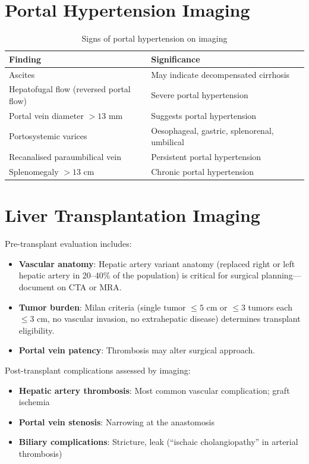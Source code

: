 \section{Portal Hypertension Imaging}
\begin{table}[h]
\centering
\caption{Signs of portal hypertension on imaging}
\begin{tabular}{p{5cm} p{5cm}}
\hline
\textbf{Finding} & \textbf{Significance} \\
\hline
Ascites & May indicate decompensated cirrhosis \\
Hepatofugal flow (reversed portal flow) & Severe portal hypertension \\
Portal vein diameter $> 13$ mm & Suggests portal hypertension \\
Portosystemic varices & Oesophageal, gastric, splenorenal, umbilical \\
Recanalised paraumbilical vein & Persistent portal hypertension \\
Splenomegaly $> 13$ cm & Chronic portal hypertension \\
\hline
\end{tabular}
\end{table}


\section{Liver Transplantation Imaging}
Pre-transplant evaluation includes:
\begin{itemize}
  \item \textbf{Vascular anatomy}: Hepatic artery variant anatomy (replaced right or left hepatic artery in 20--40\% of the population) is critical for surgical planning---document on CTA or MRA.
  \item \textbf{Tumor burden}: Milan criteria (single tumor $\leq 5$ cm or $\leq 3$ tumors each $\leq 3$ cm, no vascular invasion, no extrahepatic disease) determines transplant eligibility.
  \item \textbf{Portal vein patency}: Thrombosis may alter surgical approach.
\end{itemize}

Post-transplant complications assessed by imaging:
\begin{itemize}
  \item \textbf{Hepatic artery thrombosis}: Most common vascular complication; graft ischemia
  \item \textbf{Portal vein stenosis}: Narrowing at the anastomosis
  \item \textbf{Biliary complications}: Stricture, leak (``ischaic cholangiopathy'' in arterial thrombosis)
\end{itemize}


